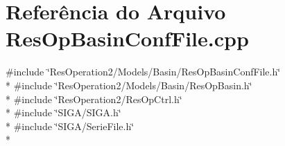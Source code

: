 \section{Referência do Arquivo Res\+Op\+Basin\+Conf\+File.\+cpp}
\label{_res_op_basin_conf_file_8cpp}
{\ttfamily \#include \char`\"{}Res\+Operation2/\+Models/\+Basin/\+Res\+Op\+Basin\+Conf\+File.\+h\char`\"{}}\\*
{\ttfamily \#include \char`\"{}Res\+Operation2/\+Models/\+Basin/\+Res\+Op\+Basin.\+h\char`\"{}}\\*
{\ttfamily \#include \char`\"{}Res\+Operation2/\+Res\+Op\+Ctrl.\+h\char`\"{}}\\*
{\ttfamily \#include \char`\"{}S\+I\+G\+A/\+S\+I\+G\+A.\+h\char`\"{}}\\*
{\ttfamily \#include \char`\"{}S\+I\+G\+A/\+Serie\+File.\+h\char`\"{}}\\*
